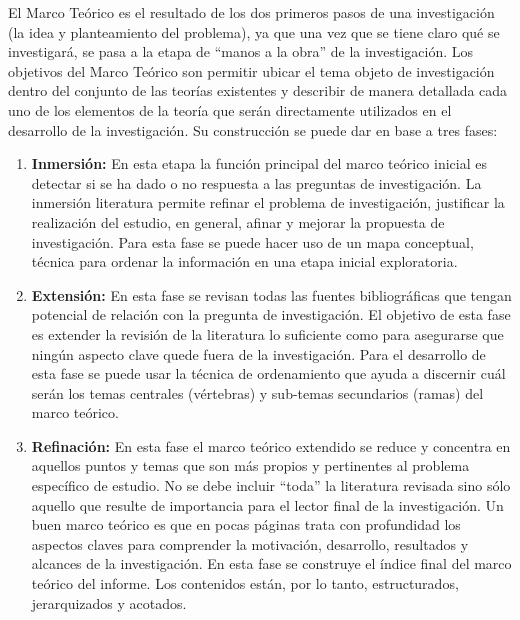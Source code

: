 
El Marco Teórico es el resultado de los dos primeros pasos de una investigación (la idea y planteamiento del problema), ya que una vez que se tiene claro qué se investigará, se pasa a la etapa de ``manos a la obra'' de la investigación. Los objetivos del Marco Teórico son permitir ubicar el tema objeto de investigación dentro del conjunto de las teorías existentes y describir de manera detallada cada uno de los elementos de la teoría que serán directamente utilizados en el desarrollo de la investigación. Su construcción se puede dar en base a tres fases:

\begin{enumerate}
  \item \textbf{Inmersión:} En esta etapa la función principal del marco teórico inicial es detectar si se ha dado o no respuesta a las preguntas de investigación. La inmersión literatura permite refinar el problema de investigación, justificar la realización del estudio, en general, afinar y mejorar la propuesta de investigación. Para esta fase se puede hacer uso de un mapa conceptual, técnica para ordenar la información en una etapa inicial exploratoria.

  \item \textbf{Extensión:} En esta fase se revisan todas las fuentes bibliográficas que tengan potencial de relación con la pregunta de investigación. El objetivo de esta fase es extender la revisión de la literatura lo suficiente como para asegurarse que ningún aspecto clave quede fuera de la investigación. Para el desarrollo de esta fase se puede usar la técnica de ordenamiento que ayuda a discernir cuál serán los temas centrales (vértebras) y sub-temas secundarios (ramas) del marco teórico.

  \item \textbf{Refinación:} En esta fase el marco teórico extendido se reduce y concentra en aquellos puntos y temas que son más propios y pertinentes al problema específico de estudio. No se debe incluir “toda” la literatura revisada sino sólo aquello que resulte de importancia para el lector final de la investigación.
  Un buen marco teórico es que en pocas páginas trata con profundidad los aspectos claves para comprender la motivación, desarrollo, resultados y alcances de la investigación. En esta fase se construye el índice final del marco teórico del informe. Los contenidos están, por lo tanto, estructurados, jerarquizados y acotados.

\end{enumerate}

